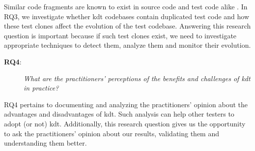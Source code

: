 Similar code fragments are known to exist in source code and test code alike \cite{Baker1995, Roy2009, Rattan2013, Lavoie2017}. In RQ3, we investigate whether \gls{kdt} codebases contain duplicated test code and how these test clones affect the evolution of the test codebase. Answering this research question is important because if such test clones exist, we need to investigate appropriate techniques to detect them, analyze them and monitor their evolution.

\begin{description}
\item[\textbf{RQ4}:] \emph{What are the practitioners' perceptions of the benefits and challenges of \gls{kdt} in practice?}
\end{description}

RQ4 pertains to documenting and analyzing the practitioners' opinion about the advantages and disadvantages of \gls{kdt}. Such analysis can help other testers to adopt (or not) \gls{kdt}. Additionally, this research question gives us the opportunity to ask the practitioners' opinion about our results, validating them and understanding them better.
